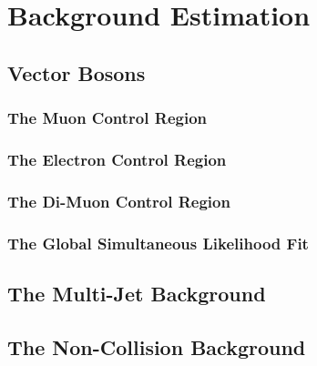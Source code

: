 \documentclass[10pt,twoside,cucitura,classica,english,openany]{toptesi}
\begin{document}


\section{Background Estimation}
\label{sec:backgr-estim}



\subsection{Vector Bosons }
\label{sec:vector-bosons-}



\subsubsection{The Muon Control Region}
\label{sec:muon-control-region}



\subsubsection{The Electron Control Region}
\label{sec:electr-contr-regi}



\subsubsection{The Di-Muon Control Region}
\label{sec:di-muon-control}



\subsubsection{The Global Simultaneous Likelihood Fit}
\label{sec:glob-simult-likel}



\subsection{The Multi-Jet Background}
\label{sec:multi-jet-background}



\subsection{The Non-Collision Background}
\label{sec:non-coll-backgr}
\end{document}
